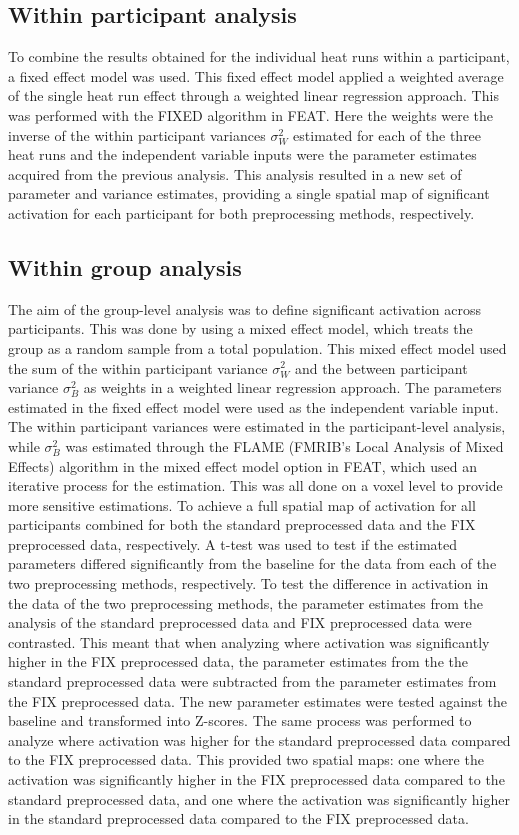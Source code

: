 \subsection{Within participant analysis}
To combine the results obtained for the individual heat runs within a participant, a fixed effect model was used. This fixed effect model applied a weighted average of the single heat run effect through a weighted linear regression approach. This was performed with the FIXED algorithm in FEAT. Here the weights were the inverse of the within participant variances $\sigma_{W}^{2}$ estimated for each of the three heat runs and the independent variable inputs were the parameter estimates acquired from the previous analysis. This analysis resulted in a new set of parameter and variance estimates, providing a single spatial map of significant activation for each participant for both preprocessing methods, respectively.

\subsection{Within group analysis}
The aim of the group-level analysis was to define significant activation across participants. This was done by using a mixed effect model, which treats the group as a random sample from a total population. This mixed effect model used the sum of the within participant variance $\sigma_{W}^{2}$ and the between participant variance $\sigma_{B}^{2}$ as weights in a weighted linear regression approach. The parameters estimated in the fixed effect model were used as the independent variable input. The within participant variances were estimated in the participant-level analysis, while $\sigma_{B}^{2}$ was estimated through the FLAME (FMRIB's Local Analysis of Mixed Effects) algorithm in the mixed effect model option in FEAT, which used an iterative process for the estimation. This was all done on a voxel level to provide more sensitive estimations.
To achieve a full spatial map of activation for all participants combined for both the standard preprocessed data and the FIX preprocessed data, respectively. A t-test was used to test if the estimated parameters differed significantly from the baseline for the data from each of the two preprocessing methods, respectively. 
To test the difference in activation in the data of the two preprocessing methods, the parameter estimates from the analysis of the standard preprocessed data and FIX preprocessed data were contrasted. This meant that when analyzing where activation was significantly higher in the FIX preprocessed data, the parameter estimates from the the standard preprocessed data were subtracted from the parameter estimates from the FIX preprocessed data. The new parameter estimates were tested against the baseline and transformed into Z-scores. The same process was performed to analyze where activation was higher for the standard preprocessed data compared to the FIX preprocessed data. This provided two spatial maps: one where the activation was significantly higher in the FIX preprocessed data compared to the standard preprocessed data, and one where the activation was significantly higher in the standard preprocessed data compared to the FIX preprocessed data.

